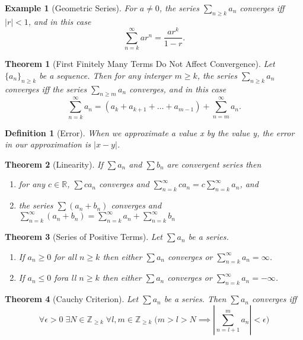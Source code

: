 \documentclass[11pt, oneside]{book}
\theoremstyle{break}
\newtheorem{thm}{Theorem}[section]
\newtheorem{defn}{Definition}[section]
\newtheorem{eg}{Example}[section]
\newcommand{\bb}[1]{\mathbb{#1}}		%
\begin{document}
\begin{eg}[Geometric Series]
	For $a \neq 0$, the series $\sum_{n \geq k} a_n$ converges iff $|r| < 1$, and in this case
	\[
		\sum_{n = k}^{\infty} ar^n = \frac{ar^k}{1 - r}.
	\]
\end{eg}

\begin{thm}[First Finitely Many Terms Do Not Affect Convergence]
	Let $\{a_n\}_{n \geq k}$ be a sequence. Then for any interger $m \geq k$, the series $\sum_{n \geq k} a_n$ converges iff the series $\sum_{n \geq m} a_n$ converges, and in this case
	\[
		\sum_{n = k}^{\infty} a_n = (a_k + a_{k + 1} + \hdots + a_{m - 1}) + \sum_{n = m}^{\infty} a_n.
	\]
\end{thm}

\begin{defn}[Error]
	When we approximate a value x by the value y, the error in our approximation is $|x - y|$.
\end{defn}

\begin{thm}[Linearity]\label{series_linearity}
	If $\sum a_n$ and $\sum b_n$ are convergent series then
	\begin{enumerate}
		\item for any $c \in \bb{R}$, $\sum ca_n$ converges and $\sum\limits_{n=k}^{\infty} ca_n = c \sum\limits_{n=k}^{\infty} a_n$, and
		\item the series $\sum (a_n + b_n)$ converges and $\sum\limits_{n=k}^{\infty} (a_n + b_n) = \sum\limits_{n=k}^{\infty} a_n + \sum\limits_{n=k}^{\infty} b_n$
	\end{enumerate}
\end{thm}

\begin{thm}[Series of Positive Terms]
	Let $\sum a_n$ be a series.
	\begin{enumerate}
		\item If $a_n \geq 0$ for all $n \geq k$ then either $\sum a_n$ converges or $\sum\limits_{n = k}^{\infty} a_n = \infty$.
		\item If $a_n \leq 0$ fora ll $n \geq k$ then either $\sum a_n$ converges or $\sum\limits_{n = k}^{\infty} a_n = -\infty$.
	\end{enumerate}
\end{thm}

\begin{thm}[Cauchy Criterion]
	Let $\sum a_n$ be a series. Then $\sum a_n$ converges iff
	\[
		\forall \epsilon > 0 \; \exists N \in \bb{Z}_{\geq k} \; \forall l, m \in \bb{Z}_{\geq k} \; \Bigg(m > l > N \implies \left|\sum_{n = l +1}^{m} a_n \right| < \epsilon \Bigg)
	\]
\end{thm}
\end{document}
